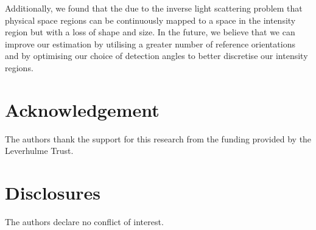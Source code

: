 \documentclass[final,  3p]{elsarticle}
\begin{document}
Additionally, we found that the due to the inverse light scattering problem that physical space regions can be continuously mapped to a space in the intensity region but with a loss of shape and size. In the future, we believe that we can improve our estimation by utilising a greater number of reference orientations and by optimising our choice of detection angles to better discretise our intensity regions. 


\section*{Acknowledgement}

The authors thank the support for this research from the funding
provided by the Leverhulme Trust.


\section*{Disclosures}

The authors declare no conflict of interest. 


 


\newpage
\appendix
\onecolumn
\end{document}
